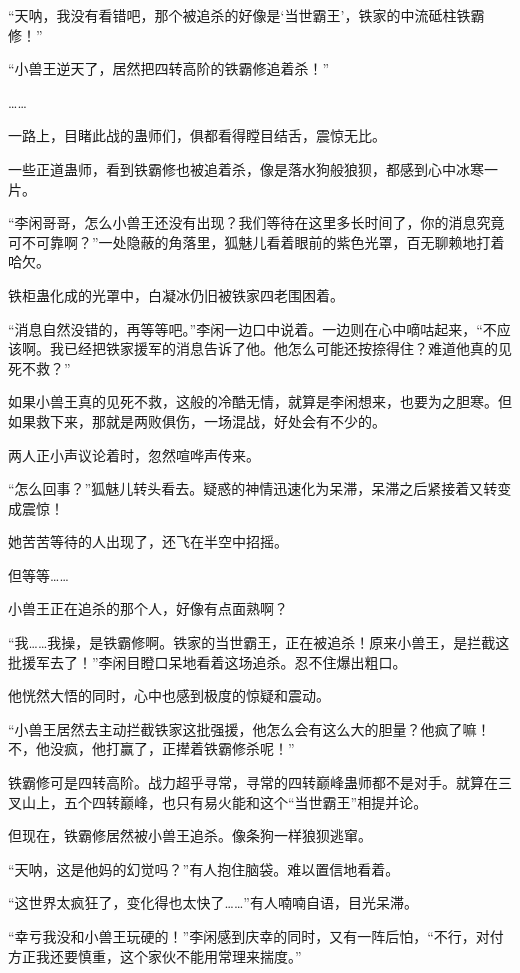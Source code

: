 \begin{this_body}
“天呐，我没有看错吧，那个被追杀的好像是‘当世霸王’，铁家的中流砥柱铁霸修！”

“小兽王逆天了，居然把四转高阶的铁霸修追着杀！”

……

一路上，目睹此战的蛊师们，俱都看得瞠目结舌，震惊无比。

一些正道蛊师，看到铁霸修也被追着杀，像是落水狗般狼狈，都感到心中冰寒一片。

“李闲哥哥，怎么小兽王还没有出现？我们等待在这里多长时间了，你的消息究竟可不可靠啊？”一处隐蔽的角落里，狐魅儿看着眼前的紫色光罩，百无聊赖地打着哈欠。

铁柜蛊化成的光罩中，白凝冰仍旧被铁家四老围困着。

“消息自然没错的，再等等吧。”李闲一边口中说着。一边则在心中嘀咕起来，“不应该啊。我已经把铁家援军的消息告诉了他。他怎么可能还按捺得住？难道他真的见死不救？”

如果小兽王真的见死不救，这般的冷酷无情，就算是李闲想来，也要为之胆寒。但如果救下来，那就是两败俱伤，一场混战，好处会有不少的。

两人正小声议论着时，忽然喧哗声传来。

“怎么回事？”狐魅儿转头看去。疑惑的神情迅速化为呆滞，呆滞之后紧接着又转变成震惊！

她苦苦等待的人出现了，还飞在半空中招摇。

但等等……

小兽王正在追杀的那个人，好像有点面熟啊？

“我……我操，是铁霸修啊。铁家的当世霸王，正在被追杀！原来小兽王，是拦截这批援军去了！”李闲目瞪口呆地看着这场追杀。忍不住爆出粗口。

他恍然大悟的同时，心中也感到极度的惊疑和震动。

“小兽王居然去主动拦截铁家这批强援，他怎么会有这么大的胆量？他疯了嘛！不，他没疯，他打赢了，正撵着铁霸修杀呢！”

铁霸修可是四转高阶。战力超乎寻常，寻常的四转巅峰蛊师都不是对手。就算在三叉山上，五个四转巅峰，也只有易火能和这个“当世霸王”相提并论。

但现在，铁霸修居然被小兽王追杀。像条狗一样狼狈逃窜。

“天呐，这是他妈的幻觉吗？”有人抱住脑袋。难以置信地看着。

“这世界太疯狂了，变化得也太快了……”有人喃喃自语，目光呆滞。

“幸亏我没和小兽王玩硬的！”李闲感到庆幸的同时，又有一阵后怕，“不行，对付方正我还要慎重，这个家伙不能用常理来揣度。”


\end{this_body}
